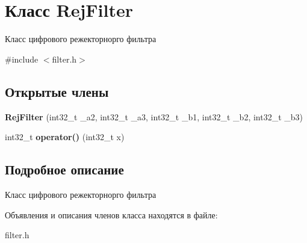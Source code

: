 \hypertarget{classRejFilter}{}\section{Класс Rej\+Filter}
\label{classRejFilter}


Класс цифрового режекторнорго фильтра  




{\ttfamily \#include $<$filter.\+h$>$}

\subsection*{Открытые члены}
\begin{DoxyCompactItemize}
\item 
\mbox{\label{classRejFilter_aceebd3a2f24c0c0a02dcaa85a8e213d6}} 
{\bfseries Rej\+Filter} (int32\+\_\+t \+\_\+a2, int32\+\_\+t \+\_\+a3, int32\+\_\+t \+\_\+b1, int32\+\_\+t \+\_\+b2, int32\+\_\+t \+\_\+b3)
\item 
\mbox{\label{classRejFilter_a1b46ca8d86aab44fd6ce6d3dce946257}} 
int32\+\_\+t {\bfseries operator()} (int32\+\_\+t x)
\end{DoxyCompactItemize}


\subsection{Подробное описание}
Класс цифрового режекторнорго фильтра 

Объявления и описания членов класса находятся в файле\+:\begin{DoxyCompactItemize}
\item 
filter.\+h\end{DoxyCompactItemize}
